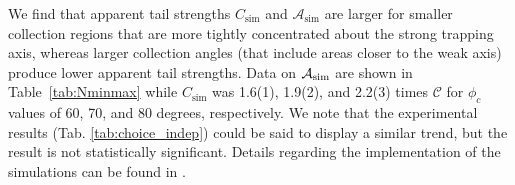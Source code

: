	{We find that apparent tail strengths $C_\textrm{sim}$ {and $\mathcal{A}_\textrm{sim}$ are} larger for smaller collection regions that are more tightly concentrated about the %
	strong trapping axis, whereas larger collection angles (that include areas closer to the weak axis) produce lower apparent tail strengths. 
	{Data on $\mathcal{A}_{\rm sim}$ are shown in Table~\ref{tab:Nminmax} while 
	$C_\textrm{sim}$ was 1.6(1), 1.9(2), and 2.2(3) times $\mathcal{C}$ for $\phi_c$ values of 60, 70, and 80 degrees, respectively.}
	We note that the experimental results (Tab. \ref{tab:choice_indep}) could be said to display a similar trend, but the result is not statistically significant.
	Details regarding the implementation of the simulations can be found in \cite{Ross21}.


}
